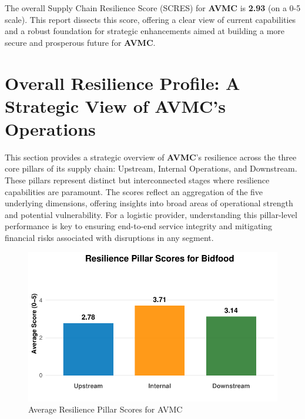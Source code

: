 \documentclass[
  oneside,
  open=any,
  fontsize=11pt]{scrbook}
\begin{document}
The overall Supply Chain Resilience Score (SCRES) for \textbf{AVMC} is
\textbf{2.93} (on a 0-5 scale). This report dissects this score,
offering a clear view of current capabilities and a robust foundation
for strategic enhancements aimed at building a more secure and
prosperous future for \textbf{AVMC}.

\chapter{Overall Resilience Profile: A Strategic View of AVMC's
Operations}\label{overall-resilience-profile-a-strategic-view-of-avmcs-operations}

This section provides a strategic overview of \textbf{AVMC}'s resilience
across the three core pillars of its supply chain: Upstream, Internal
Operations, and Downstream. These pillars represent distinct but
interconnected stages where resilience capabilities are paramount. The
scores reflect an aggregation of the five underlying dimensions,
offering insights into broad areas of operational strength and potential
vulnerability. For a logistic provider, understanding this pillar-level
performance is key to ensuring end-to-end service integrity and
mitigating financial risks associated with disruptions in any segment.

\begin{figure}[H]

{\centering \includegraphics[width=1\linewidth,height=\textheight,keepaspectratio]{example_3_files/figure-pdf/pillar-scores-chart-1.pdf}

}

\caption{Average Resilience Pillar Scores for AVMC}

\end{figure}%
\end{document}
